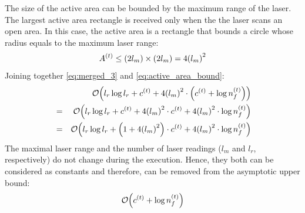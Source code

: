 The size of the active area can be bounded by the maximum range of the laser.
The largest active area rectangle is received only when the the laser scans an open
area. In this case, the active area is a rectangle that bounds a circle whose
radius equals to the maximum laser range: 
\begin{equation} 
\label{eq:active_area_bound}
A^{\left(t\right)} \le {\left(2l_{m}\right)} \times {\left(2l_{m}\right)} =
4{\left(l_{m}\right)}^2
\end{equation} 
Joining together \eqref{eq:merged_3} and \eqref{eq:active_area_bound}:
\begin{eqnarray}
&&\mathcal{O}{\left(l_r\log{l_r} + 
        c^{\left(t\right)} +
        4{\left(l_{m}\right)}^2 \cdot
        {\left(c^{\left(t\right)} +
        \log{n_f^{\left(t\right)}}\right)}
     \right)} \nonumber \\
&=&\mathcal{O}{\left(l_r\log{l_r} + 
        c^{\left(t\right)} +
        4{\left(l_{m}\right)}^2 \cdot c^{\left(t\right)} +
        4{\left(l_{m}\right)}^2 \cdot\log{n_f^{\left(t\right)}}\right)} \nonumber \\      
&=&\mathcal{O}{\left(l_r\log{l_r} + 
        {\left(1+4{\left(l_{m}\right)}^2\right)} \cdot c^{\left(t\right)} +
        4{\left(l_{m}\right)}^2 \cdot\log{n_f^{\left(t\right)}}\right)}   
\end{eqnarray} 
The maximal laser range and the number of laser readings ($l_m$ and
$l_r$, respectively) do not change during the execution. Hence, they both 
can be considered as constants and therefore, can be removed from the
asymptotic upper bound:
\begin{equation}\label{eq:ffd_final_complexity_single_iteration}
\mathcal{O}{\left(c^{\left(t\right)} +
        \log{n_f^{\left(t\right)}}\right)}        
\end{equation}

